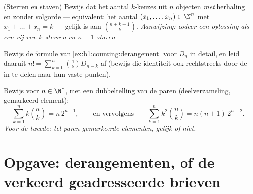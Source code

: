 \begin{exercise}[$\star\star$]\label{exo:b1:counting:10}
(Sterren en staven) Bewijs dat het aantal $k$-keuzes uit $n$ objecten
\emph{met} herhaling en zonder volgorde --- equivalent: het aantal
$(x_1, \dots, x_n) \in \N^n$ met $x_1 + \dots + x_n = k$ --- gelijk is
aan $\binom{n + k - 1}{k}$. \emph{Aanwijzing: codeer een oplossing als
een rij van $k$ sterren en $n - 1$ staven.}
\end{exercise}

\begin{exercise}[$\star\star\star$]\label{exo:b1:counting:11}
Bewijs de formule van \cref{ex:b1:counting:derangement} voor $D_n$ in
detail, en leid daaruit $n! = \sum_{k=0}^{n} \binom{n}{k} D_{n-k}$ af
(bewijs die identiteit ook rechtstreeks door de  in te delen
naar hun  vaste punten).
\end{exercise}

\begin{exercise}[$\star\star\star$]\label{exo:b1:counting:12}
Bewijs voor $n \in \N^*$, met een dubbeltelling van de paren
(deelverzameling, gemarkeerd element):
\[
\sum_{k=1}^{n} k \binom{n}{k} = n\, 2^{n-1},
\qquad\text{en vervolgens}\qquad
\sum_{k=1}^{n} k^2 \binom{n}{k} = n(n+1)\, 2^{n-2} .
\]
\emph{Voor de tweede: tel paren gemarkeerde elementen, gelijk of niet.}
\end{exercise}

\section{Opgave: derangementen, of de verkeerd geadresseerde brieven}

